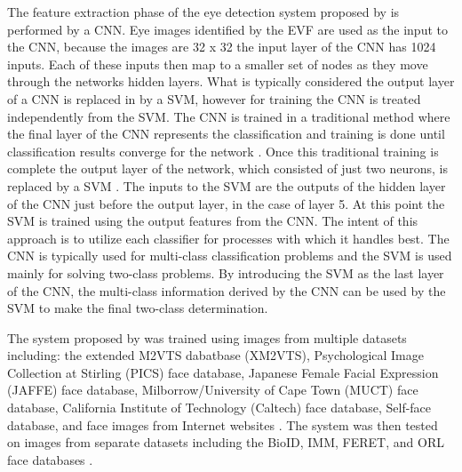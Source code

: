 The feature extraction phase of the eye detection system proposed by \cite{yu2018eye} is performed by a CNN. Eye images identified by the EVF are used as the input to the CNN, because the images are 32 x 32 the input layer of the CNN has 1024 inputs. Each of these inputs then map to a smaller set of nodes as they move through the networks hidden layers. What is typically considered the output layer of a CNN is replaced in \cite{yu2018eye} by a SVM, however for training the CNN is treated independently from the SVM. The CNN is trained in a traditional method where the final layer of the CNN represents the classification and training is done until classification results converge for the network \cite{yu2018eye}. Once this traditional training is complete the output layer of the network, which consisted of just two neurons, is replaced by a SVM \cite{yu2018eye}. The inputs to the SVM are the outputs of the hidden layer of the CNN just before the output layer, in the case of \cite{yu2018eye} layer 5. At this point the SVM is trained using the output features from the CNN. The intent of this approach is to utilize each classifier for processes with which it handles best. The CNN is typically used for multi-class classification problems and the SVM is used mainly for solving two-class problems. By introducing the SVM as the last layer of the CNN, the multi-class information derived by the CNN can be used by the SVM to make the final two-class determination.

The system proposed by \cite{yu2018eye} was trained using images from multiple datasets including: the extended M2VTS dabatbase (XM2VTS), Psychological Image Collection at Stirling (PICS) face database, Japanese Female Facial Expression (JAFFE) face database, Milborrow/University of Cape Town (MUCT) face database, California Institute of Technology (Caltech) face database, Self-face database, and face images from Internet websites \cite{yu2018eye}. The system was then tested on images from separate datasets including the BioID, IMM, FERET, and ORL face databases \cite{yu2018eye}.

